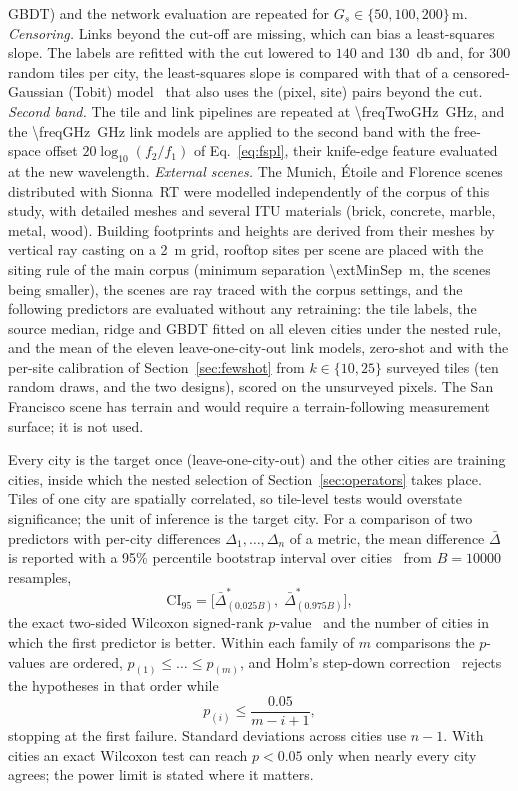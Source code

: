 GBDT) and the network evaluation are repeated for $G_s\in\{50,100,200\}$\,m.
\emph{Censoring.} Links beyond the cut-off are missing, which can bias a
least-squares slope. The labels are refitted with the cut lowered to $140$
and \SI{130}{\decibel} and, for \num{300} random tiles per city, the
least-squares slope is compared with that of a censored-Gaussian (Tobit)
model~\cite{tobin1958} that also uses the (pixel, site) pairs beyond the
cut. \emph{Second band.} The tile and link pipelines are repeated at
\SI{\freqTwoGHz}{\giga\hertz}, and the \SI{\freqGHz}{\giga\hertz} link
models are applied to the second band with the free-space offset
$20\log_{10}(f_2/f_1)$ of Eq.~\eqref{eq:fspl}, their knife-edge feature
evaluated at the new wavelength. \emph{External scenes.} The Munich,
\'Etoile and Florence scenes distributed with Sionna~RT were modelled
independently of the corpus of this study, with detailed meshes and several
ITU materials (brick, concrete, marble, metal, wood). Building footprints
and heights are derived from their meshes by vertical ray casting on a
\SI{2}{\metre} grid, \nExtSitesWord{} rooftop sites per scene are placed with
the siting rule of the main corpus (minimum separation
\SI{\extMinSep}{\metre}, the scenes being smaller), the scenes are ray
traced with the corpus settings, and the following predictors are evaluated
without any retraining: the tile labels, the source median, ridge and GBDT
fitted on all eleven cities under the nested rule, and the mean of the
eleven leave-one-city-out link models, zero-shot and with the per-site
calibration of Section~\ref{sec:fewshot} from $k\in\{10,25\}$ surveyed tiles
(ten random draws, and the two designs), scored on the unsurveyed pixels.
The San Francisco scene has terrain and would require a terrain-following
measurement surface; it is not used.

Every city is the target once (leave-one-city-out) and the other cities are
training cities, inside which the nested selection of
Section~\ref{sec:operators} takes place. Tiles of one city are spatially
correlated, so tile-level tests would overstate significance; the unit of
inference is the target city. For a comparison of two predictors with
per-city differences $\Delta_1,\dots,\Delta_n$ of a metric, the mean
difference $\bar\Delta$ is reported with a 95\% percentile bootstrap
interval over cities~\cite{efron1993} from $B=\num{10000}$ resamples,
\begin{equation}
\mathrm{CI}_{95}=\bigl[\bar\Delta^{*}_{(0.025B)},\;\bar\Delta^{*}_{(0.975B)}\bigr],
\label{eq:boot}
\end{equation}
the exact two-sided Wilcoxon signed-rank $p$-value~\cite{wilcoxon1945} and
the number of cities in which the first predictor is better. Within each
family of $m$ comparisons the $p$-values are ordered,
$p_{(1)}\le\dots\le p_{(m)}$, and Holm's step-down
correction~\cite{holm1979} rejects the hypotheses in that order while
\begin{equation}
p_{(i)}\le\frac{0.05}{m-i+1},
\label{eq:holm}
\end{equation}
stopping at the first failure. Standard deviations across cities use
$n-1$. With \nCities{} cities an exact Wilcoxon test can reach $p<0.05$ only
when nearly every city agrees; the power limit is stated where it matters.
